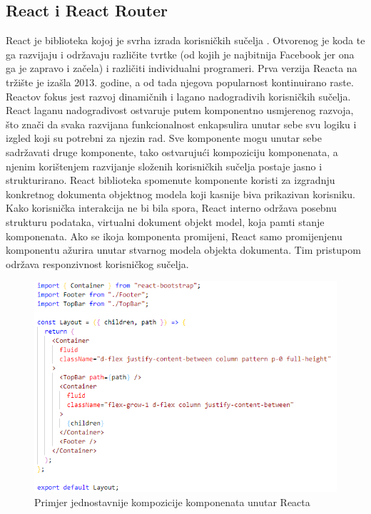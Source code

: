 \documentclass[times, utf8, zavrsni, numeric]{fer}
\begin{document}
			\subsection{React i React Router}
			React\cite{react2021} je biblioteka kojoj je svrha izrada korisničkih sučelja . Otvorenog je koda te ga razvijaju i održavaju različite tvrtke (od kojih je najbitnija Facebook jer ona ga je zapravo i začela) i različiti individualni programeri. Prva verzija Reacta na tržište je izašla 2013. godine, a od tada njegova popularnost kontinuirano raste. Reactov fokus jest razvoj dinamičnih i lagano nadogradivih korisničkih sučelja. React laganu nadogradivost ostvaruje putem komponentno usmjerenog razvoja, što znači da svaka razvijana funkcionalnost enkapsulira unutar sebe svu logiku i izgled koji su potrebni za njezin rad. Sve komponente mogu unutar sebe sadržavati druge komponente, tako ostvarujući kompoziciju  komponenata, a njenim korištenjem razvijanje složenih korisničkih sučelja postaje jasno i strukturirano. React biblioteka spomenute komponente koristi za izgradnju konkretnog dokumenta objektnog modela koji kasnije biva prikazivan korisniku. Kako korisnička interakcija ne bi bila spora, React interno održava posebnu strukturu podataka, virtualni dokument objekt model, koja pamti stanje komponenata. Ako se ikoja komponenta promijeni, React samo promijenjenu komponentu ažurira unutar stvarnog modela objekta dokumenta. Tim pristupom održava responzivnost korisničkog sučelja.\\
			\begin{figure}[H]
				\centering
				\includegraphics[scale=0.75]{pictures/prikazi/React.png}
				\caption{Primjer jednostavnije kompozicije komponenata unutar Reacta}
				\label{fig:react}
			\end{figure}
\end{document}
